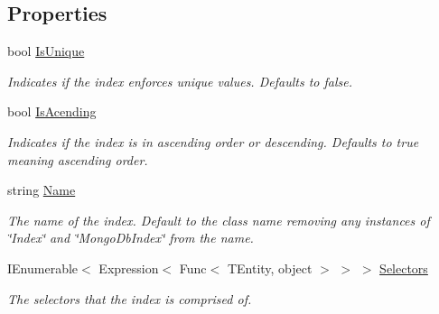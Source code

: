 \subsection*{Properties}
\begin{DoxyCompactItemize}
\item 
bool \hyperlink{classCqrs_1_1MongoDB_1_1DataStores_1_1Indexes_1_1MongoDbIndex_a8618b5c9ec2aa1972a57b61aac05bcdd_a8618b5c9ec2aa1972a57b61aac05bcdd}{Is\+Unique}
\begin{DoxyCompactList}\small\item\em Indicates if the index enforces unique values. Defaults to false. \end{DoxyCompactList}\item 
bool \hyperlink{classCqrs_1_1MongoDB_1_1DataStores_1_1Indexes_1_1MongoDbIndex_a0151a455f20dabb16c15156dc1cdf85f_a0151a455f20dabb16c15156dc1cdf85f}{Is\+Acending}
\begin{DoxyCompactList}\small\item\em Indicates if the index is in ascending order or descending. Defaults to true meaning ascending order. \end{DoxyCompactList}\item 
string \hyperlink{classCqrs_1_1MongoDB_1_1DataStores_1_1Indexes_1_1MongoDbIndex_af18f67df8e73bc4d9fc2239cd6d798b6_af18f67df8e73bc4d9fc2239cd6d798b6}{Name}
\begin{DoxyCompactList}\small\item\em The name of the index. Default to the class name removing any instances of \char`\"{}\+Index\char`\"{} and \char`\"{}\+Mongo\+Db\+Index\char`\"{} from the name. \end{DoxyCompactList}\item 
I\+Enumerable$<$ Expression$<$ Func$<$ T\+Entity, object $>$ $>$ $>$ \hyperlink{classCqrs_1_1MongoDB_1_1DataStores_1_1Indexes_1_1MongoDbIndex_a13bb1a8d07f1cce7c8d6ce77e3be0629_a13bb1a8d07f1cce7c8d6ce77e3be0629}{Selectors}
\begin{DoxyCompactList}\small\item\em The selectors that the index is comprised of. \end{DoxyCompactList}\end{DoxyCompactItemize}



